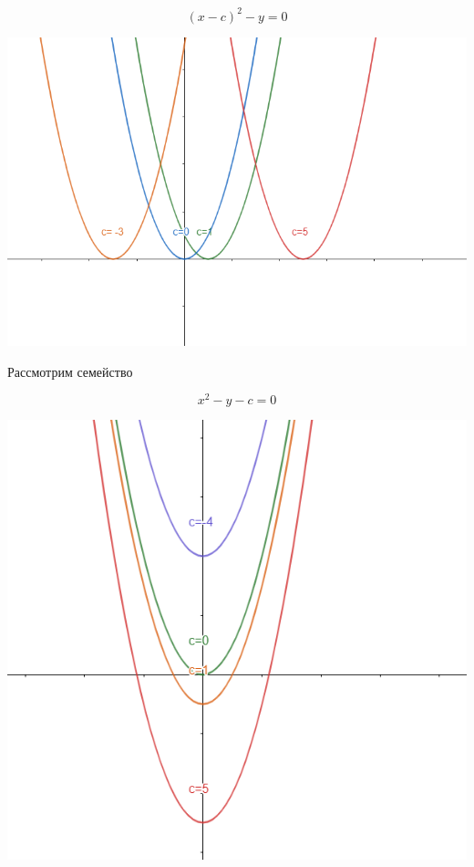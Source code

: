 \documentclass[../../main.tex]{subfiles}
\begin{document}
\[ \left( x-c \right)^2 - y = 0 \]

\begin{center} \includegraphics[scale=0.8]{first_family.png} \end{center}


Рассмотрим семейство 

\[ x^2 - y - c = 0 \]

\begin{center} \includegraphics[scale=0.8]{second_family.png} \end{center}
\end{document}

